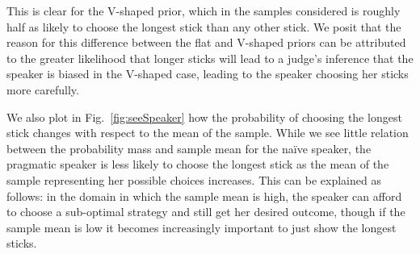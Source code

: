 \documentclass[10pt,letterpaper]{article}
\begin{document}
This is clear for the V-shaped prior, which in the samples considered is roughly half as likely to choose the longest stick than any other stick.
We posit that the reason for this difference between the flat and V-shaped priors can be attributed to the greater likelihood that longer sticks
will lead to a judge's inference that the speaker is biased in the V-shaped case, leading to the speaker choosing her sticks more carefully.

We also plot in Fig.~\ref{fig:seeSpeaker} how the probability of choosing the longest stick changes with respect to the mean of the sample.
While we see little relation between the probability mass and sample mean for the na\"ive speaker, the pragmatic speaker is less likely to choose the longest stick as
the mean of the sample representing her possible choices increases. This can be explained as follows: in the domain in which the sample mean is high, the speaker
can afford to choose a sub-optimal strategy and still get her desired outcome, though if the sample mean is low it becomes 
increasingly important to just show the longest sticks.
\end{document}

